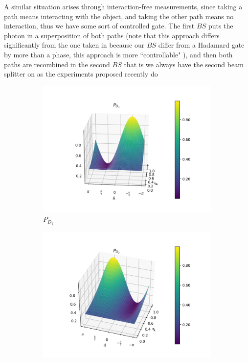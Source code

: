 \documentclass{book}
\begin{document}
A similar situation arises through interaction-free measurements, since taking a path means interacting with the object, and taking the other path means no interaction, thus we have some sort of controlled gate. The first $BS$ puts the photon in a superposition of both paths (note that this approach differs significantly from the one taken in \cite{Peruzzo,Kaiser2012} because our $BS$ differ from a Hadamard gate by more than a phase, this approach is more ``controllable" ), and then both paths are recombined in the second $BS$ that is we always have the second beam splitter on as the experiments proposed recently do \cite{Polino}

\begin{figure}[H]
\centering
\begin{subfigure}[b]{0.30\linewidth}
\includegraphics[width=\linewidth]{images/pd1_2.png}
\caption{$P_{D_{1}}$}
\end{subfigure}
\begin{subfigure}[b]{0.30\linewidth}
\includegraphics[width=\linewidth]{images/pd2_2.png}

\end{subfigure}
\end{figure}
\end{document}
